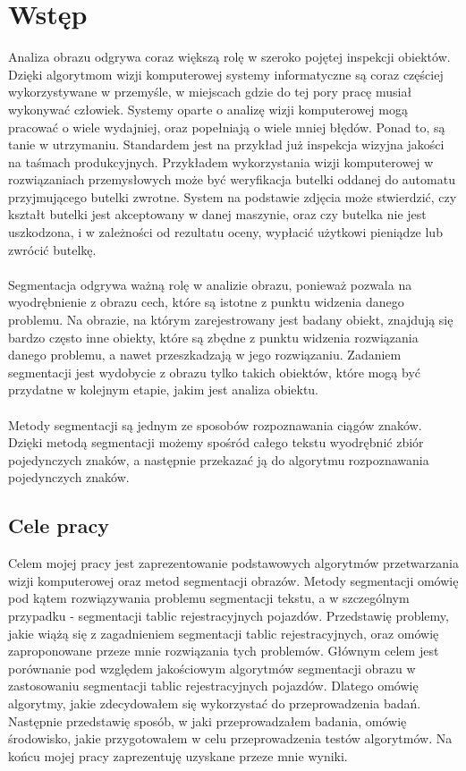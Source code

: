 \section{Wstęp}
Analiza obrazu odgrywa coraz większą rolę w szeroko pojętej inspekcji obiektów. Dzięki algorytmom wizji komputerowej systemy informatyczne są coraz częściej wykorzystywane w przemyśle, w miejscach gdzie do tej pory pracę musiał wykonywać człowiek. Systemy oparte o analizę wizji komputerowej mogą pracować o wiele wydajniej, oraz popełniają o wiele mniej błędów. Ponad to, są tanie w utrzymaniu. Standardem jest na przykład już inspekcja wizyjna jakości na taśmach produkcyjnych. Przykładem wykorzystania wizji komputerowej w rozwiązaniach przemysłowych może być weryfikacja butelki oddanej do automatu przyjmującego butelki zwrotne. System na podstawie zdjęcia może stwierdzić, czy kształt butelki jest akceptowany w danej maszynie, oraz czy butelka nie jest uszkodzona, i w zależności od rezultatu oceny, wypłacić użytkowi pieniądze lub zwrócić butelkę.
\paragraph{}
Segmentacja odgrywa ważną rolę w analizie obrazu, ponieważ pozwala na wyodrębnienie z obrazu cech, które są istotne z punktu widzenia danego problemu. Na obrazie, na którym zarejestrowany jest badany obiekt, znajdują się bardzo często inne obiekty, które są zbędne z punktu widzenia rozwiązania danego problemu, a nawet przeszkadzają w jego rozwiązaniu. Zadaniem segmentacji jest wydobycie z obrazu tylko takich obiektów, które mogą być przydatne w kolejnym etapie, jakim jest analiza obiektu.
\paragraph{}
Metody segmentacji są jednym ze sposobów rozpoznawania ciągów znaków. Dzięki metodą segmentacji możemy spośród całego tekstu wyodrębnić zbiór pojedynczych znaków, a następnie przekazać ją do algorytmu rozpoznawania pojedynczych znaków.

\subsection{Cele pracy}
Celem mojej pracy jest zaprezentowanie podstawowych algorytmów przetwarzania wizji komputerowej oraz metod segmentacji obrazów. Metody segmentacji omówię pod kątem rozwiązywania problemu segmentacji tekstu, a w szczególnym przypadku - segmentacji tablic rejestracyjnych pojazdów. Przedstawię problemy, jakie wiążą się z zagadnieniem segmentacji tablic rejestracyjnych, oraz omówię zaproponowane przeze mnie rozwiązania tych problemów. Głównym celem jest porównanie pod względem jakościowym algorytmów segmentacji obrazu w zastosowaniu segmentacji tablic rejestracyjnych pojazdów. Dlatego omówię algorytmy, jakie zdecydowałem się wykorzystać do przeprowadzenia badań. Następnie przedstawię sposób, w jaki przeprowadzałem badania, omówię środowisko, jakie przygotowałem w celu przeprowadzenia testów algorytmów. Na końcu mojej pracy zaprezentuję uzyskane przeze mnie wyniki.
